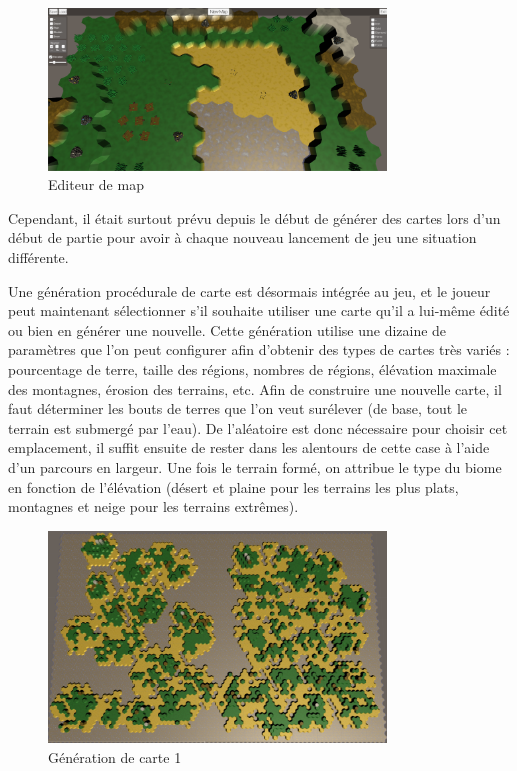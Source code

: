 \documentclass[12pt]{report}
\begin{document}
\begin{figure}[H]
    \centering
    \includegraphics[width=0.8\textwidth]{EditorScreen}
    \caption{Editeur de map}
\end{figure}

Cependant, il était surtout prévu depuis le début de générer des cartes lors
d'un début de partie pour avoir à chaque nouveau lancement de jeu une situation
différente.

Une génération procédurale de carte est désormais intégrée au jeu, et le joueur
peut maintenant sélectionner s'il souhaite utiliser une carte qu'il a lui-même
édité ou bien en générer une nouvelle. Cette génération utilise une dizaine de
paramètres que l'on peut configurer afin d'obtenir des types de cartes très
variés : pourcentage de terre, taille des régions, nombres de régions,
élévation maximale des montagnes, érosion des terrains, etc. Afin de construire
une nouvelle carte, il faut déterminer les bouts de terres que l'on veut
surélever (de base, tout le terrain est submergé par l'eau). De l'aléatoire est
donc nécessaire pour choisir cet emplacement, il suffit ensuite de rester dans
les alentours de cette case à l'aide d'un parcours en largeur. Une fois le
terrain formé, on attribue le type du biome en fonction de l'élévation (désert
et plaine pour les terrains les plus plats, montagnes et neige pour les
terrains extrêmes).

\begin{figure}[H]
    \centering
    \includegraphics[width=0.8\textwidth]{MapGen1}
    \caption{Génération de carte 1}
\end{figure}
\end{document}
